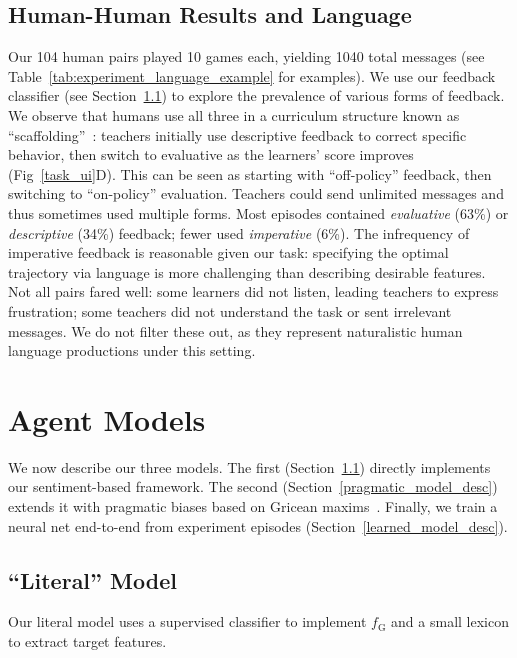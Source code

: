 \documentclass[letterpaper]{article} %
\begin{document}
\subsection{Human-Human Results and Language}
\label{observed_language_in_experiment}
Our 104 human pairs played 10 games each, yielding 1040 total messages (see Table~\ref{tab:experiment_language_example} for examples). We use our feedback classifier (see Section~\ref{literal_model_desc}) to explore the prevalence of various forms of feedback. We observe that humans use all three in a curriculum structure known as ``scaffolding''~\cite{shute_2008}: teachers initially use descriptive feedback to correct specific behavior, then switch to evaluative as the learners' score improves (Fig~\ref{task_ui}D). This can be seen as starting with ``off-policy'' feedback, then switching to ``on-policy'' evaluation. Teachers could send unlimited messages and thus sometimes used multiple forms. Most episodes contained \textit{evaluative} (63\%) or \textit{descriptive}  (34\%) feedback; fewer used \textit{imperative} (6\%). The infrequency of imperative feedback is reasonable given our task: specifying the optimal trajectory via language is more challenging than describing desirable features. Not all pairs fared well: some learners did not listen, leading teachers to express frustration; some teachers did not understand the task or sent irrelevant messages. We do not filter these out, as they represent naturalistic human language productions under this setting.

\section{Agent Models}
\label{models_section}
\label{stateful_beliefs}
We now describe our three models. The first (Section~\ref{literal_model_desc}) directly implements our sentiment-based framework. The second (Section~\ref{pragmatic_model_desc}) extends it with pragmatic biases based on Gricean maxims~\citep{grice1975logic}. Finally, we train a neural net end-to-end from experiment episodes (Section~\ref{learned_model_desc}).

\subsection{``Literal'' Model}
\label{literal_model_desc}
\label{phrase_classifier}
\label{reference_types_details}
Our literal model uses a supervised classifier to implement $f_\text{G}$ and a small lexicon to extract target features.
\end{document}
